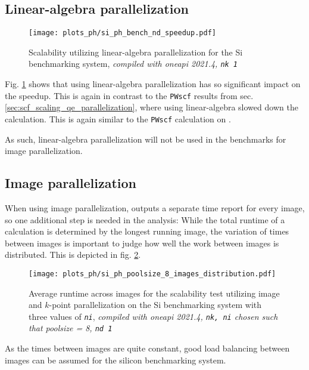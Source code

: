 \documentclass[main.tex]{subfiles}
\begin{document}
\subsection{Linear-algebra parallelization}

\begin{figure}[htb!]
    \centering
    \texttt{[image: plots\_ph/si\_ph\_bench\_nd\_speedup.pdf]}
    \caption{Scalability utilizing linear-algebra parallelization for the Si benchmarking system, \emph{\QE compiled with \gls{oneapi} 2021.4, \texttt{nk 1}}}
    \label{fig:scaling_ph_nd_si}
\end{figure}
Fig. \ref{fig:scaling_ph_nd_si} shows that using linear-algebra parallelization has so significant impact on the speedup.
This is again in contrast to the \texttt{PWscf} results from sec. \ref{sec:scf_scaling_qe_parallelization}, where using linear-algebra slowed down the calculation.
This is again similar to the \texttt{PWscf} calculation on \TaS.

As such, linear-algebra parallelization will not be used in the benchmarks for image parallelization.

\subsection{Image parallelization}\label{sub:scaling_ph_images}

When using image parallelization, \QE outputs a separate time report for every image, so one additional step is needed in the analysis:
While the total runtime of a calculation is determined by the longest running image, the variation of times between images is important to judge how well the work between images is distributed.
This is depicted in fig. \ref{fig:scaling_ph_ni_poolsize_8_si_distribution}.

\begin{figure}[htb!]
    \centering
    \texttt{[image: plots\_ph/si\_ph\_poolsize\_8\_images\_distribution.pdf]}
    \caption{Average runtime across images for the scalability test utilizing image and \(k\)-point parallelization on the Si benchmarking system with three values of \emph{\texttt{ni}}, \emph{\QE compiled with \gls{oneapi} 2021.4, \texttt{nk, ni} chosen such that poolsize = 8, \texttt{nd 1}}}
    \label{fig:scaling_ph_ni_poolsize_8_si_distribution}
\end{figure}
As the times between images are quite constant, good load balancing between images can be assumed for the silicon benchmarking system.
\end{document}
